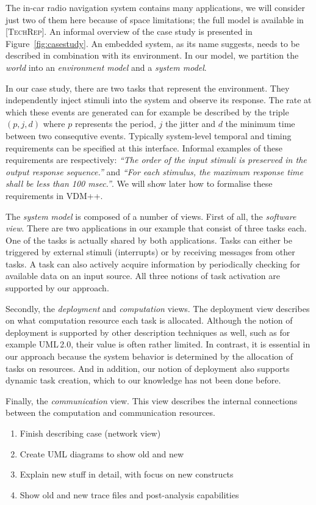 The in-car radio navigation system contains many applications, we will
consider just two of them here because of space limitations; the full
model is available in \textsc{[TechRep]}. An informal overview of the
case study is presented in Figure~\ref{fig:casestudy}. An embedded system,
as its name suggests, needs to be described in combination with its
environment. In our model, we partition the \textit{world} into an
\textit{environment model} and a \textit{system model}.

In our case study, there are two tasks that represent the environment.
They independently inject stimuli into the system and observe its response.
The rate at which these events are generated can for example be described by
the triple $(p,j,d)$ where $p$ represents the period, $j$ the jitter and
$d$ the minimum time between two consequtive events. Typically system-level
temporal and timing requirements can be specified at this interface. Informal
examples of these requirements are respectively: \textit{``The order of the
input stimuli is preserved in the output response sequence.''} and
\textit{``For each stimulus, the maximum response time shall be less than
100 msec.''}. We will show later how to formalise these requirements in VDM++.

The \textit{system model} is composed of a number of views. First of all,
the \textit{software view}. There are two applications in our example that
consist of three tasks each. One of the tasks is actually shared by both
applications. Tasks can either be triggered by external stimuli (interrupts)
or by receiving messages from other tasks. A task can also actively acquire
information by periodically checking for available data on an input source.
All three notions of task activation are supported by our approach.

Secondly, the \textit{deployment} and \textit{computation} views. The
deployment view describes on what computation resource each task is
allocated. Although the notion of deployment is supported by other
description techniques as well, such as for example UML\,2.0, their
value is often rather limited. In contrast, it is essential in our
approach because the system behavior is determined by the allocation
of tasks on resources. And in addition, our notion of deployment also
supports dynamic task creation, which to our knowledge has not been
done before.

Finally, the \textit{communication} view. This view describes the
internal connections between the computation and communication
resources.

\begin{enumerate}
\item Finish describing case (network view)
\item Create UML diagrams to show old and new
\item Explain new stuff in detail, with focus on new constructs
\item Show old and new trace files and post-analysis capabilities
\end{enumerate}
